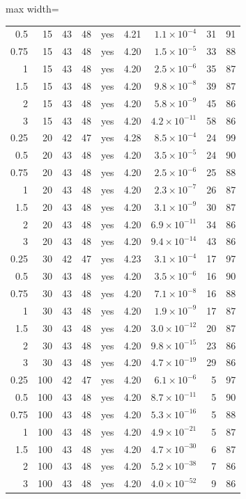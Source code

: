 \documentclass[11pt,letterpaper,fleqn]{article}
\begin{document}
\begin{table}[p]
\begin{adjustbox}{max width=\textwidth}
\begin{tabular}{@{}rrrrcrrrr@{}}
0.5 & 15 & 43 & 48 & yes & 4.21 & $1.1\times10^{-4}$ & 31 & 91\\
0.75 & 15 & 43 & 48 & yes & 4.20 & $1.5\times10^{-5}$ & 33 & 88\\
1 & 15 & 43 & 48 & yes & 4.20 & $2.5\times10^{-6}$ & 35 & 87\\
1.5 & 15 & 43 & 48 & yes & 4.20 & $9.8\times10^{-8}$ & 39 & 87\\
2 & 15 & 43 & 48 & yes & 4.20 & $5.8\times10^{-9}$ & 45 & 86\\
3 & 15 & 43 & 48 & yes & 4.20 & $4.2\times10^{-11}$ & 58 & 86\\
0.25 & 20 & 42 & 47 & yes & 4.28 & $8.5\times10^{-4}$ & 24 & 99\\
0.5 & 20 & 43 & 48 & yes & 4.20 & $3.5\times10^{-5}$ & 24 & 90\\
0.75 & 20 & 43 & 48 & yes & 4.20 & $2.5\times10^{-6}$ & 25 & 88\\
1 & 20 & 43 & 48 & yes & 4.20 & $2.3\times10^{-7}$ & 26 & 87\\
1.5 & 20 & 43 & 48 & yes & 4.20 & $3.1\times10^{-9}$ & 30 & 87\\
2 & 20 & 43 & 48 & yes & 4.20 & $6.9\times10^{-11}$ & 34 & 86\\
3 & 20 & 43 & 48 & yes & 4.20 & $9.4\times10^{-14}$ & 43 & 86\\
0.25 & 30 & 42 & 47 & yes & 4.23 & $3.1\times10^{-4}$ & 17 & 97\\
0.5 & 30 & 43 & 48 & yes & 4.20 & $3.5\times10^{-6}$ & 16 & 90\\
0.75 & 30 & 43 & 48 & yes & 4.20 & $7.1\times10^{-8}$ & 16 & 88\\
1 & 30 & 43 & 48 & yes & 4.20 & $1.9\times10^{-9}$ & 17 & 87\\
1.5 & 30 & 43 & 48 & yes & 4.20 & $3.0\times10^{-12}$ & 20 & 87\\
2 & 30 & 43 & 48 & yes & 4.20 & $9.8\times10^{-15}$ & 23 & 86\\
3 & 30 & 43 & 48 & yes & 4.20 & $4.7\times10^{-19}$ & 29 & 86\\
0.25 & 100 & 42 & 47 & yes & 4.20 & $6.1\times10^{-6}$ & 5 & 97\\
0.5 & 100 & 43 & 48 & yes & 4.20 & $8.7\times10^{-11}$ & 5 & 90\\
0.75 & 100 & 43 & 48 & yes & 4.20 & $5.3\times10^{-16}$ & 5 & 88\\
1 & 100 & 43 & 48 & yes & 4.20 & $4.9\times10^{-21}$ & 5 & 87\\
1.5 & 100 & 43 & 48 & yes & 4.20 & $4.7\times10^{-30}$ & 6 & 87\\
2 & 100 & 43 & 48 & yes & 4.20 & $5.2\times10^{-38}$ & 7 & 86\\
3 & 100 & 43 & 48 & yes & 4.20 & $4.0\times10^{-52}$ & 9 & 86\\
\bottomrule\end{tabular}\end{adjustbox}\end{table}
\end{document}
